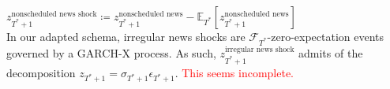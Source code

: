 \documentclass[11pt]{article}
\def\t#1{\tilde{#1}} %
\def\E{\mathbb{E}} %
\theoremstyle{definition}
\begin{document}
$z_{T^{*}+1}^{\text{nonscheduled news shock}} \coloneqq z_{T^{*}+1}^{\text{nonscheduled news}} - \E_{T^{*}}[z_{T^{*}+1}^{\text{nonscheduled news}}]$ \\

In our adapted schema, irregular news shocks are $\mathcal{F}_{T^{*}}$-zero-expectation events governed by a GARCH-X process.  As such, $z_{T^{*}+1}^{\text{irregular news shock}}$ admits of the decomposition $z_{T^{*}+1} = \sigma_{T^{*}+1}\epsilon_{T^{*}+1}$. \textcolor{red}{This seems incomplete.}

\end{document}
